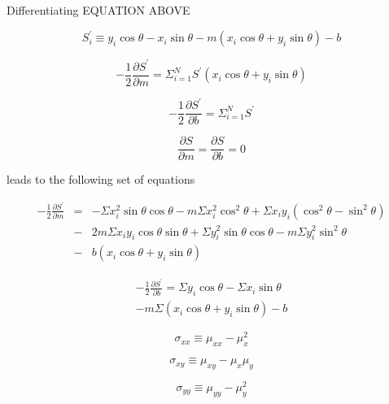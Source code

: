 \documentclass{article}
\newcommand{\meanx}{\ensuremath{\mu_{x}}}
\newcommand{\meanxsquared}{\ensuremath{\mu_{x}^{2}}}
\newcommand{\meany}{\ensuremath{\mu_{y}}}
\newcommand{\meanysquared}{\ensuremath{\mu_{y}^{2}}}
\newcommand{\meanxx}{\ensuremath{\mu_{xx}}}
\newcommand{\meanxy}{\ensuremath{\mu_{xy}}}
\newcommand{\meanyy}{\ensuremath{\mu_{yy}}}
\newcommand{\sxx}{\ensuremath{\sigma_{xx}}}
\newcommand{\sxy}{\ensuremath{\sigma_{xy}}}
\newcommand{\syy}{\ensuremath{\sigma_{yy}}}
\begin{document}
Differentiating EQUATION ABOVE

\begin{equation}
S^{\prime}_{i} \equiv y_{i} \cos \theta - x_{i} \sin \theta - m \left( x_{i} \cos \theta + y_{i} \sin \theta \right) - b
\end{equation}

\begin{equation}
-\frac{1}{2}\frac{\partial S^{\prime}}{\partial m} = \Sigma_{i=1}^{N} S^{\prime} \left( x_{i} \cos \theta + y_{i} \sin \theta \right)
\end{equation}

\begin{equation}
-\frac{1}{2}\frac{\partial S^{\prime}}{\partial b} = \Sigma_{i=1}^{N} S^{\prime} 
\end{equation}

\begin{equation}
\frac{\partial S}{\partial m} = \frac{\partial S}{\partial b} = 0
\end{equation}

leads to the following set of equations

\begin{eqnarray}
-\frac{1}{2}\frac{\partial S^{\prime}}{\partial m} & = & - \Sigma x_{i}^{2} \sin \theta \cos \theta - m \Sigma x_{i}^{2} \cos^{2} \theta 
+ \Sigma x_{i} y_{i} \left( \cos^{2} \theta  - \sin^{2} \theta \right) \\
& - & 2m \Sigma x_{i} y_{i} \cos \theta \sin \theta + \Sigma y_{i}^{2} \sin \theta \cos \theta - m \Sigma y_{i}^{2} \sin^{2} \theta \\
& - & b \left( x_{i} \cos \theta + y_{i} \sin \theta \right)
\end{eqnarray}

\begin{eqnarray}
-\frac{1}{2}\frac{\partial S^{\prime}}{\partial b} = 
\Sigma y_{i} \cos \theta - \Sigma x_{i} \sin \theta \\
- m \Sigma \left( x_{i} \cos \theta + y_{i} \sin \theta \right) - b
\end{eqnarray}


\begin{equation}
\sxx \equiv \meanxx - {\meanxsquared}
\end{equation}

\begin{equation}
\sxy \equiv \meanxy - \meanx \meany
\end{equation}

\begin{equation}
\syy \equiv \meanyy - \meanysquared
\end{equation}
\end{document}
